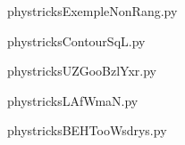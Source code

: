     

    \clearpage
    


    \newcommand{\CaptionFigExempleNonRang}{<+Type your caption here+>}
    \begin{center}
        
    \end{center}
    phystricksExempleNonRang.py

    

    \clearpage
    


    \newcommand{\CaptionFigContourSqL}{<+Type your caption here+>}
    \begin{center}
        
    \end{center}
    phystricksContourSqL.py

    

    \clearpage
    


    \newcommand{\CaptionFigUZGooBzlYxr}{<+Type your caption here+>}
    \begin{center}
        
    \end{center}
    phystricksUZGooBzlYxr.py

    

    \clearpage
    


    \newcommand{\CaptionFigLAfWmaN}{<+Type your caption here+>}
    \begin{center}
        
    \end{center}
    phystricksLAfWmaN.py

    

    \clearpage
    


    \newcommand{\CaptionFigBEHTooWsdrys}{<+Type your caption here+>}
    \begin{center}
        
    \end{center}
    phystricksBEHTooWsdrys.py

    

    \clearpage
    


